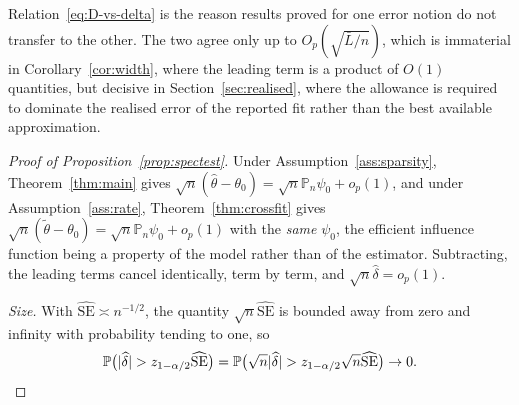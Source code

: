 \documentclass[11pt]{article}
\theoremstyle{plain}
\theoremstyle{definition}
\theoremstyle{remark}
\newcommand{\PP}{\mathbb{P}}
\newcommand{\Pn}{\mathbb{P}_n}
\newcommand{\thetahat}{\widehat{\theta}}
\newcommand{\thetatil}{\widetilde{\theta}}
\DeclarePairedDelimiter{\abs}{\lvert}{\rvert}
\begin{document}
\noindent Relation~\eqref{eq:D-vs-delta} is the reason results proved for one
error notion do not transfer to the other. The two agree only up to
$O_p(\sqrt{\bar L/n})$, which is immaterial in Corollary~\ref{cor:width}, where
the leading term is a product of $O(1)$ quantities, but decisive in
Section~\ref{sec:realised}, where the allowance is required to dominate the
realised error of the reported fit rather than the best available approximation.

\begin{proof}[Proof of Proposition~\ref{prop:spectest}]
Under Assumption~\ref{ass:sparsity}, Theorem~\ref{thm:main} gives
$\sqrt n(\thetahat-\theta_0)=\sqrt n\Pn\psi_0+o_p(1)$, and under
Assumption~\ref{ass:rate}, Theorem~\ref{thm:crossfit} gives
$\sqrt n(\thetatil-\theta_0)=\sqrt n\Pn\psi_0+o_p(1)$ with the \emph{same}
$\psi_0$, the efficient influence function being a property of the model rather
than of the estimator. Subtracting, the leading terms cancel identically, term by
term, and $\sqrt n\widehat\delta=o_p(1)$.

\emph{Size.} With $\widehat{\mathrm{SE}}\asymp n^{-1/2}$, the quantity
$\sqrt n\widehat{\mathrm{SE}}$ is bounded away from zero and infinity with
probability tending to one, so
\[
  \PP\bigl(\abs{\widehat\delta}>z_{1-\alpha/2}\widehat{\mathrm{SE}}\bigr)
  =\PP\bigl(\sqrt n\abs{\widehat\delta}
   >z_{1-\alpha/2}\sqrt n\widehat{\mathrm{SE}}\bigr)\to0 .
\]


\end{proof}
\end{document}
